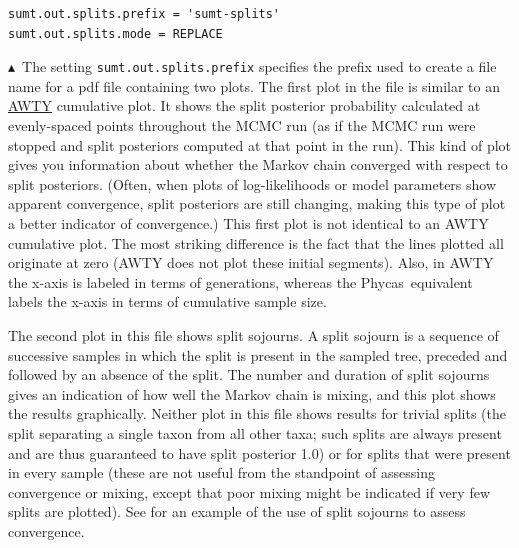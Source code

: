 \documentclass[10pt]{article}
\newcommand{\opt}[2]{{\tt \small #1.#2}\index{#1!#2}}	%
\newcommand{\phycas}{{\sc Phycas}\index{Phycas}}
\newcommand{\pointup}{$\blacktriangle$}
\newcommand{\indexed}[1]{#1\index{#1}}
\begin{document}
\begin{samepage}
\begin{verbatim}
sumt.out.splits.prefix = 'sumt-splits'
sumt.out.splits.mode = REPLACE
\end{verbatim}
\pointup\ The setting \opt{sumt}{out.splits.prefix} specifies the prefix used to create a file name for a pdf file containing two plots. The first plot in the file is similar to an \href{http://king2.scs.fsu.edu/CEBProjects/awty/awty_start.php}{AWTY} \citep{Nylander:2008p471} cumulative plot. It shows the split posterior probability calculated at evenly-spaced points throughout the MCMC run (as if the MCMC run were stopped and split posteriors computed at that point in the run). This kind of plot gives you information about whether the Markov chain converged with respect to split posteriors. (Often, when plots of log-likelihoods or model parameters show apparent convergence, split posteriors are still changing, making this type of plot a better indicator of convergence.) This first plot is not identical to an AWTY cumulative plot. The most striking difference is the fact that the lines plotted all originate at zero (AWTY does not plot these initial segments). Also, in AWTY the x-axis is labeled in terms of generations, whereas the \phycas\ equivalent labels the x-axis in terms of cumulative sample size. 

The second plot in this file shows split \indexed{sojourn}s. A split sojourn is a sequence of successive samples in which the split is present in the sampled tree, preceded and followed by an absence of the split. The number and duration of split sojourns gives an indication of how well the Markov chain is mixing, and this plot shows the results graphically. Neither plot in this file shows results for trivial splits (the split separating a single taxon from all other taxa; such splits are always present and are thus guaranteed to have split posterior 1.0) or for splits that were present in every sample (these are not useful from the standpoint of assessing convergence or mixing, except that poor mixing might be indicated if very few splits are plotted). See \citet{LewisLewis2005} for an example of the use of split sojourns to assess convergence. 
\end{samepage}
\end{document}
